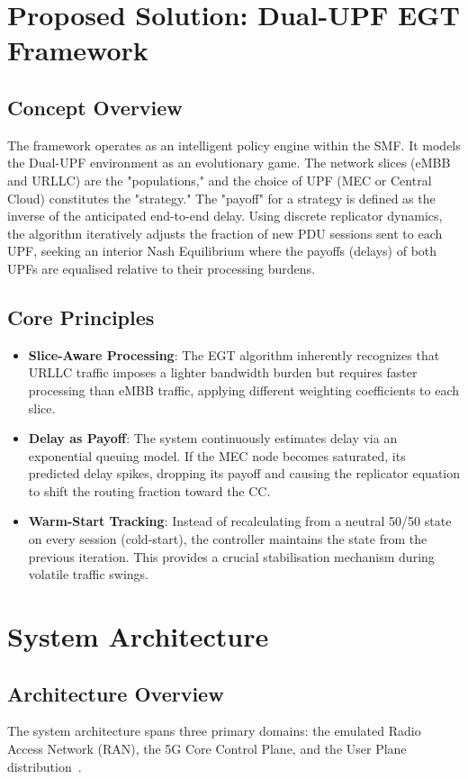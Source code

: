 \documentclass[11pt,a4paper,english]{article}
\begin{document}
\section{Proposed Solution: Dual-UPF EGT Framework}
\subsection{Concept Overview}
The framework operates as an intelligent policy engine within the SMF. It models the Dual-UPF environment as an evolutionary game. The network slices (eMBB and URLLC) are the "populations," and the choice of UPF (MEC or Central Cloud) constitutes the "strategy." The "payoff" for a strategy is defined as the inverse of the anticipated end-to-end delay. Using discrete replicator dynamics, the algorithm iteratively adjusts the fraction of new PDU sessions sent to each UPF, seeking an interior Nash Equilibrium where the payoffs (delays) of both UPFs are equalised relative to their processing burdens.

\subsection{Core Principles}
\begin{itemize}
    \item \textbf{Slice-Aware Processing}: The EGT algorithm inherently recognizes that URLLC traffic imposes a lighter bandwidth burden but requires faster processing than eMBB traffic, applying different weighting coefficients to each slice.
    \item \textbf{Delay as Payoff}: The system continuously estimates delay via an exponential queuing model. If the MEC node becomes saturated, its predicted delay spikes, dropping its payoff and causing the replicator equation to shift the routing fraction toward the CC.
    \item \textbf{Warm-Start Tracking}: Instead of recalculating from a neutral 50/50 state on every session (cold-start), the controller maintains the state from the previous iteration. This provides a crucial stabilisation mechanism during volatile traffic swings.
\end{itemize}

\newpage

\section{System Architecture}
\subsection{Architecture Overview}
The system architecture spans three primary domains: the emulated Radio Access Network (RAN), the 5G Core Control Plane, and the User Plane distribution~\cite{3gpp_ts23501}. 
\end{document}
